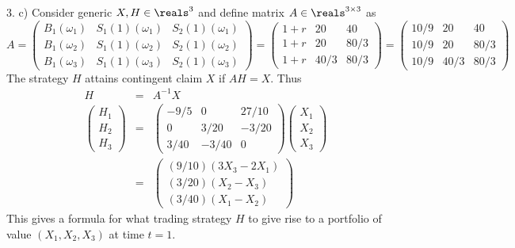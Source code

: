 \documentclass[11pt,a4paper]{article}
\begin{document}
\begin{answer}{3. c)}
  Consider generic $X,H\in\reals^3$ and define matrix $A\in\reals^{3\times3}$ as
  \[ A=\begin{pmatrix}
    B_1(\omega_1)&S_1(1)(\omega_1)&S_2(1)(\omega_1)\\
    B_1(\omega_2)&S_1(1)(\omega_2)&S_2(1)(\omega_2)\\
    B_1(\omega_3)&S_1(1)(\omega_3)&S_2(1)(\omega_3)
  \end{pmatrix}=\begin{pmatrix}
    1+r&20&40\\
    1+r&20&80/3\\
    1+r&40/3&80/3
  \end{pmatrix}=\begin{pmatrix}
    10/9&20&40\\
    10/9&20&80/3\\
    10/9&40/3&80/3
  \end{pmatrix} \]
  The strategy $H$ attains contingent claim $X$ if $AH=X$. Thus
  \[\begin{array}{rcl}
    H&=&A^{-1}X\\
    \begin{pmatrix}
      H_1\\H_2\\H_3
    \end{pmatrix}&=&
    \begin{pmatrix}
      -9/5&0&27/10\\
      0&3/20&-3/20\\
      3/40&-3/40&0
    \end{pmatrix}\begin{pmatrix}
      X_1\\X_2\\X_3
    \end{pmatrix}\\
    &=&\begin{pmatrix}
        (9/10)(3X_3-2X_1)\\
        (3/20)(X_2-X_3)\\
        (3/40)(X_1-X_2)
      \end{pmatrix}
  \end{array}\]
  This gives a formula for what trading strategy $H$ to give rise to a portfolio of value $(X_1,X_2,X_3)$ at time $t=1$.
\end{answer}
\end{document}

